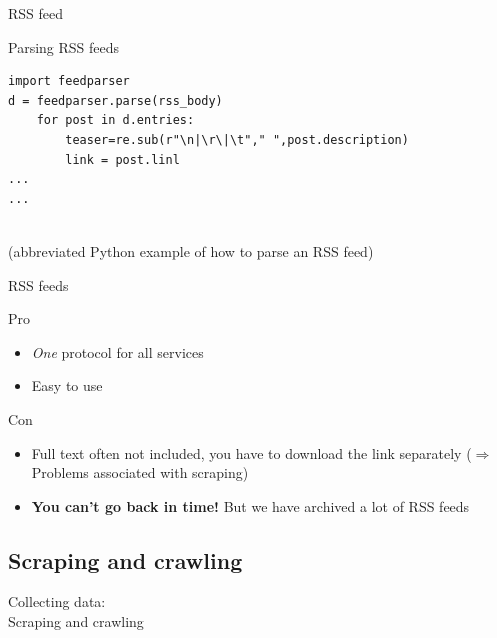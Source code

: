 \documentclass{beamer}
\begin{document}
\begin{frame}{RSS feed}
\end{frame}


\begin{frame}[fragile]{Parsing RSS feeds}
\begin{lstlisting}
import feedparser
d = feedparser.parse(rss_body)
    for post in d.entries:
        teaser=re.sub(r"\n|\r\|\t"," ",post.description)
        link = post.linl
...
...
\end{lstlisting}
~\\ \tiny{(abbreviated Python example of how to parse an RSS feed)}
\end{frame}


\begin{frame}{RSS feeds}
\begin{block}{Pro}
\begin{itemize}
\item \emph{One} protocol for all services
\item Easy to use
\end{itemize}
\end{block}

\begin{block}{Con}
\begin{itemize}
\item Full text often not included, you have to download the link separately ($\Rightarrow$ Problems associated with scraping) 
\item {\textbf{You can't go back in time!}} \footnotesize{But we have archived a lot of RSS feeds}
\end{itemize}
\end{block}

\end{frame}

\subsection{Scraping and crawling}
\begin{frame}
Collecting data:\\
Scraping and crawling
\end{frame}
\end{document}
